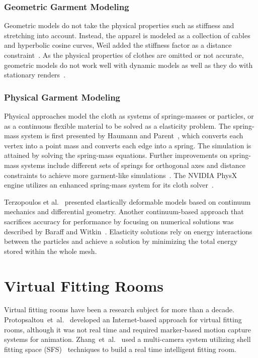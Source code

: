 \subsubsection{Geometric Garment Modeling}
Geometric models do not take the physical properties such as stiffness and stretching into account. Instead, the apparel is modeled as a collection of cables and hyperbolic cosine curves, Weil added the stiffness factor as a distance constraint~\cite{Weil1986}. As the physical properties of clothes are omitted or not accurate, geometric models do not work well with dynamic models as well as they do with stationary renders~\cite{Weil1986}.

\subsubsection{Physical Garment Modeling}
Physical approaches model the cloth as systems of springs-masses or particles, or as a continuous flexible material to be solved as a elasticity problem. The spring-mass system is first presented by Haumann and Parent~\cite{Haumann1988}, which converts each vertex into a point mass and converts each edge into a spring. The simulation is attained by solving the spring-mass equations. Further improvements on spring-mass systems include different sets of springs for orthogonal axes and distance constraints to achieve more garment-like simulations~\cite{Provot1995}. The NVIDIA PhysX engine utilizes an enhanced spring-mass system for its cloth solver~\cite{Kim2011}.

Terzopoulos et al.~\cite{Terzopoulos1987} presented elastically deformable models based on continuum mechanics and differential geometry. Another continuum-based approach that sacrifices accuracy for performance by focusing on numerical solutions was described by Baraff and Witkin~\cite{Baraff1998}. Elasticity solutions rely on energy interactions between the particles and achieve a solution by minimizing the total energy stored within the whole mesh.

\section{Virtual Fitting Rooms}
\label{section_related_virtual_fitting}

Virtual fitting rooms have been a research subject for more than a decade. Protopsaltou~et~al.~\cite{Protopsaltou2002} developed an Inter\-net-based approach for virtual fitting rooms, although it was not real time and required marker-based motion capture systems for animation. Zhang~et~al.~\cite{Zhang2008} used a multi-camera system utilizing shell fitting space (SFS)~\cite{Cheung2005} techniques to build a real time intelligent fitting room.

